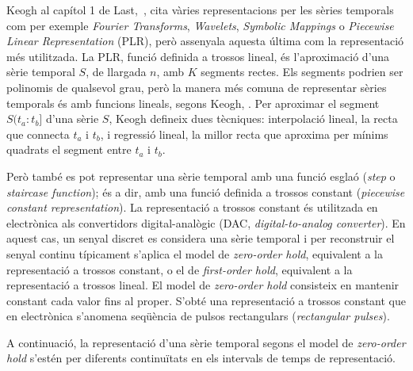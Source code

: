 Keogh al capítol 1 de Last,~\cite{last}, cita vàries representacions per les sèries temporals com per exemple \emph{Fourier Transforms}, \emph{Wavelets}, \emph{Symbolic Mappings} o \emph{Piecewise Linear Representation} (PLR), però assenyala aquesta última com la representació més utilitzada. 
La PLR, funció definida a trossos lineal, és l'aproximació d'una sèrie temporal $S$, de llargada $n$, amb $K$ segments rectes. Els segments podrien ser polinomis de qualsevol grau, però la manera més comuna de representar sèries temporals és amb funcions lineals, segons Keogh, \cite{keogh02}.
Per aproximar el segment $S(t_a:t_b]$ d'una sèrie $S$, Keogh defineix dues tècniques: interpolació lineal, la recta que connecta $t_a$ i $t_b$, i regressió lineal, la millor recta que aproxima per mínims quadrats el segment entre $t_a$ i $t_b$.

Però també es pot representar una sèrie temporal amb una funció esglaó (\emph{step} o \emph{staircase function}); és a dir, amb una funció definida a trossos constant (\emph{piecewise constant representation}).
La representació a trossos constant és utilitzada en electrònica als convertidors digital-analògic (DAC, \emph{digital-to-analog converter}). En aquest cas, un senyal discret es considera una sèrie temporal i per reconstruir el senyal continu típicament s'aplica el model de \emph{zero-order hold}, equivalent a la representació a trossos constant,  o el de \emph{first-order hold},  equivalent a la representació a trossos lineal.
El model de \emph{zero-order hold} consisteix en mantenir constant cada valor fins al proper. S'obté una representació a trossos constant que en electrònica s'anomena seqüència de pulsos rectangulars (\emph{rectangular pulses}).







A continuació,  la representació  d'una sèrie temporal segons el model de \emph{zero-order hold} s'estén per diferents continuïtats en els intervals de temps de representació.

